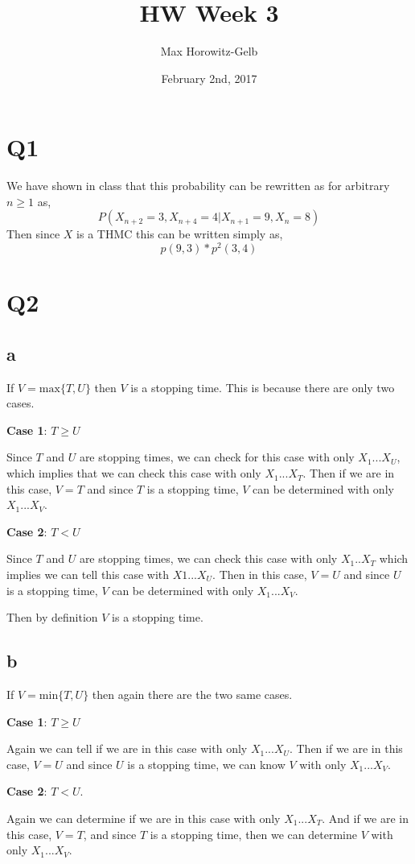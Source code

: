 \documentclass{article}
\title{HW Week 3}
\author{Max Horowitz-Gelb}
\date{February 2nd, 2017}
\begin{document}
\maketitle
\section*{Q1}
We have shown in class that this probability can be rewritten as for arbitrary $n \geq 1$ as, 
\[
P(X_{n+2} = 3, X_{n+4} = 4 | X_{n+1} = 9 , X_n = 8)
\]
Then since $X$ is a THMC this can be written simply as,
\[
p(9,3)*p^2(3,4)
\]

\section*{Q2}
\subsection*{a}
If $V = \text{max} \{T,U\}$ then $V$ is a stopping time. This is because there are only two cases.

\textbf{Case 1}: $T \geq U$

Since $T$ and $U$ are stopping times, we can check for this case with only $X_1 ... X_U$, which implies that we can check this case with only $X_1 ... X_T$. Then if we are in this case, $V = T$ and since $T$ is a stopping time, $V$ can be determined with only $X_1 ... X_{V}$.

\textbf{Case 2}: $T < U$

Since $T$ and $U$ are stopping times, we can check this case with only $X_1 .. X_T$ which implies we can tell this case with $X1 ... X_U$. Then in this case, $V = U$ and since $U$ is a stopping time, $V$ can be determined with only $X_1 ... X_{V}$.

Then by definition $V$ is a stopping time. 

\subsection*{b}
If $V = \text{min}\{T, U\}$ then again there are the two same cases.

\textbf{Case 1}: $T \geq U$

Again we can tell if we are in this case with only $X_1 ... X_U$. Then if we are in this case, $V = U$ and since $U$ is a stopping time, we can know $V$ with only $X_1 ... X_V$.

\textbf{Case 2}: $T < U$.

Again we can determine if we are in this case with only $X_1 ... X_T$. And if we are in this case, $V = T$, and since $T$ is a stopping time, then we can determine $V$ with only $X_1 ... X_V$.
\end{document}
